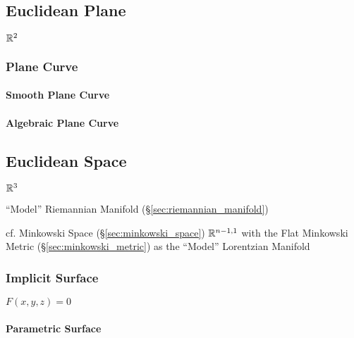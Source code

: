 \subsection{Euclidean Plane}\label{sec:euclidean_plane}

$\mathbb{R}^2$



\subsubsection{Plane Curve}\label{sec:plane_curve}

\paragraph{Smooth Plane Curve}\label{sec:smooth_plane_curve}\hfill

\paragraph{Algebraic Plane Curve}\label{sec:algebraic_plane_curve}\hfill



\subsection{Euclidean Space}\label{sec:euclidean_space}

$\mathbb{R}^3$

``Model'' Riemannian Manifold (\S\ref{sec:riemannian_manifold})

cf. Minkowski Space (\S\ref{sec:minkowski_space}) $\mathbb{R}^{n-1,1}$
with the Flat Minkowski Metric (\S\ref{sec:minkowski_metric}) as the
``Model'' Lorentzian Manifold




\subsubsection{Implicit Surface}\label{sec:implicit_surface}

$F(x,y,z) = 0$



\paragraph{Parametric Surface}\label{sec:parametric_surface}\hfill

